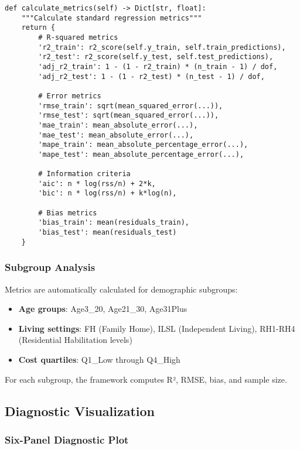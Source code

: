 \begin{verbatim}
def calculate_metrics(self) -> Dict[str, float]:
    """Calculate standard regression metrics"""
    return {
        # R-squared metrics
        'r2_train': r2_score(self.y_train, self.train_predictions),
        'r2_test': r2_score(self.y_test, self.test_predictions),
        'adj_r2_train': 1 - (1 - r2_train) * (n_train - 1) / dof,
        'adj_r2_test': 1 - (1 - r2_test) * (n_test - 1) / dof,
        
        # Error metrics
        'rmse_train': sqrt(mean_squared_error(...)),
        'rmse_test': sqrt(mean_squared_error(...)),
        'mae_train': mean_absolute_error(...),
        'mae_test': mean_absolute_error(...),
        'mape_train': mean_absolute_percentage_error(...),
        'mape_test': mean_absolute_percentage_error(...),
        
        # Information criteria
        'aic': n * log(rss/n) + 2*k,
        'bic': n * log(rss/n) + k*log(n),
        
        # Bias metrics
        'bias_train': mean(residuals_train),
        'bias_test': mean(residuals_test)
    }
\end{verbatim}

\subsubsection{Subgroup Analysis}

Metrics are automatically calculated for demographic subgroups:

\begin{itemize}
    \item \textbf{Age groups}: Age3\_20, Age21\_30, Age31Plus
    \item \textbf{Living settings}: FH (Family Home), ILSL (Independent Living), RH1-RH4 (Residential Habilitation levels)
    \item \textbf{Cost quartiles}: Q1\_Low through Q4\_High
\end{itemize}

For each subgroup, the framework computes R², RMSE, bias, and sample size.

\subsection{Diagnostic Visualization}

\subsubsection{Six-Panel Diagnostic Plot}


